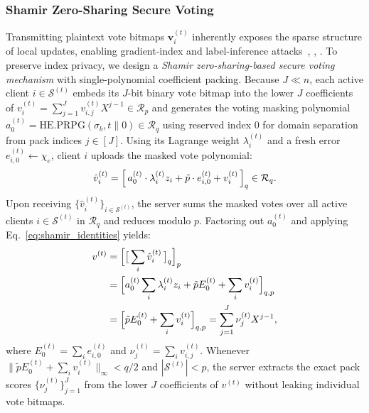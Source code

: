 \subsubsection{Shamir Zero-Sharing Secure Voting}
\label{sec:secure-voting}
Transmitting plaintext vote bitmaps $\mathbf{v}_i^{(t)}$ inherently exposes the sparse structure of local updates, enabling gradient-index and label-inference attacks~\cite{xu2025harnessing}, \cite{zhao2020idlg}, \cite{guo2025exploring}. To preserve index privacy, we design a \emph{Shamir zero-sharing-based secure voting mechanism} with single-polynomial coefficient packing. Because $J \ll n$, each active client $i \in \mathcal{S}^{(t)}$ embeds its $J$-bit binary vote bitmap into the lower $J$ coefficients of $v_i^{(t)} = \sum_{j=1}^J v_{i,j}^{(t)} X^{j-1} \in \mathcal{R}_p$ and generates the voting masking polynomial $a_0^{(t)} = \mathrm{HE.PRPG}(\sigma_b, t \parallel 0) \in \mathcal{R}_q$ using reserved index $0$ for domain separation from pack indices $j \in [J]$. Using its Lagrange weight $\lambda_i^{(t)}$ and a fresh error $e_{i,0}^{(t)} \leftarrow \chi_e$, client $i$ uploads the masked vote polynomial:
\begin{equation}
\hat{v}_i^{(t)} = \Bigl[\, a_0^{(t)} \cdot \lambda_i^{(t)} z_i + \tilde{p}\cdot e_{i,0}^{(t)} + v_i^{(t)} \,\Bigr]_q \in \mathcal{R}_q.
\label{eq:perturbation}
\end{equation}
Upon receiving $\{\hat{v}_i^{(t)}\}_{i \in \mathcal{S}^{(t)}}$, the server sums the masked votes over all active clients $i \in \mathcal{S}^{(t)}$ in $\mathcal{R}_q$ and reduces modulo $p$. Factoring out $a_0^{(t)}$ and applying Eq.~\eqref{eq:shamir_identities} yields:
\begin{align}
v^{(t)} &= \Bigl[\bigl[\, \sum_{i} \hat{v}_i^{(t)} \,\bigr]_q\Bigr]_p \notag \\
&= \Bigl[ a_0^{(t)} \sum_{i} \lambda_i^{(t)} z_i + \tilde{p} E_0^{(t)} + \sum_{i} v_i^{(t)} \Bigr]_{q,p} \notag \\
&= \Bigl[ \tilde{p} E_0^{(t)} + \sum_{i} v_i^{(t)} \Bigr]_{q,p} = \sum_{j=1}^J \nu_j^{(t)} X^{j-1},
\label{eq:cancellation}
\end{align}
where $E_0^{(t)} = \sum_{i} e_{i,0}^{(t)}$ and $\nu_j^{(t)} = \sum_{i} v_{i,j}^{(t)}$. Whenever $\|\tilde{p} E_0^{(t)} + \sum_{i} v_i^{(t)}\|_\infty < q/2$ and $|\mathcal{S}^{(t)}| < p$, the server extracts the exact pack scores $\{\nu_j^{(t)}\}_{j=1}^J$ from the lower $J$ coefficients of $v^{(t)}$ without leaking individual vote bitmaps.


